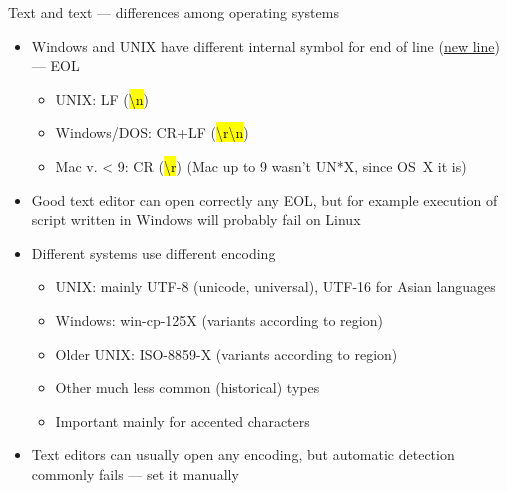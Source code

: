 \documentclass[compress, ucs, xelatex, 11pt, xcolor=svgnames,
  hyperref={
    bookmarks=true,
    unicode=true,
    colorlinks=true,
    pdftitle={Linux, command line and MetaCentrum},
    plainpages=false,
    pdfauthor={Vojtech Zeisek},
    pdfsubject={Course about use of Linux command line, writing shell scripts and using MetaCentrum of CESNET},
    pdfcreator={XeLaTeX},
    pdfkeywords={Linux, GNU, BASH, shell, command line, MetaCentrum},
    linkcolor=DarkRed,
    anchorcolor=DarkBlue,
    citecolor=Indigo,
    filecolor=NavyBlue,
    menucolor=DarkMagenta,
    urlcolor=DarkBlue,
    pdftex},
  url={hyphens, lowtilde} %
  ]{beamer}
\renewcommand{\texttt}[1]{\hl{\ttfamily #1}}
\begin{document}
\begin{frame}{Text and text --- differences among operating systems}
  \label{eolenc}
  \begin{itemize}
    \item Windows and UNIX have different internal symbol for end of line (\href{https://en.wikipedia.org/wiki/Newline}{new line}) --- EOL
    \begin{itemize}
      \item UNIX: LF (\texttt{\textbackslash n})
      \item Windows/DOS: CR+LF (\texttt{\textbackslash r\textbackslash n})
      \item Mac v. < 9: CR (\texttt{\textbackslash r}) (Mac up to 9 wasn't UN*X, since OS~X it is)
    \end{itemize}
    \item Good text editor can open correctly any EOL, but for example execution of script written in Windows will probably fail on Linux
    \item Different systems use different encoding
    \begin{itemize}
      \item UNIX: mainly UTF-8 (unicode, universal), UTF-16 for Asian languages
      \item Windows: win-cp-125X (variants according to region)
      \item Older UNIX: ISO-8859-X (variants according to region)
      \item Other much less common (historical) types
      \item Important mainly for accented characters
    \end{itemize}
    \item Text editors can usually open any encoding, but automatic detection commonly fails --- set it manually
  \end{itemize}
\end{frame}
\end{document}
